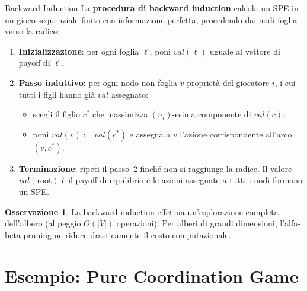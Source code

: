 \documentclass[12pt,a4paper,twoside]{book}
\theoremstyle{plain}
\theoremstyle{definition}
\newtheorem{remark}[theorem]{Osservazione}
\begin{document}
\begin{defbox}{Backward Induction}
La \textbf{procedura di backward induction} calcola un SPE in un gioco sequenziale finito con informazione perfetta, procedendo dai nodi foglia verso la radice:
\begin{enumerate}
  \item \textbf{Inizializzazione}: per ogni foglia $\ell$, poni $\mathit{val}(\ell)$ uguale al vettore di payoff di $\ell$.
  \item \textbf{Passo induttivo}: per ogni nodo non-foglia $v$ proprietà del giocatore $i$, i cui tutti i figli hanno già $\mathit{val}$ assegnato:
    \begin{itemize}
      \item scegli il figlio $c^*$ che massimizza $(u_i)$-esima componente di $\mathit{val}(c)$;
      \item poni $\mathit{val}(v) := \mathit{val}(c^*)$ e assegna a $v$ l'azione corrispondente all'arco $(v,c^*)$.
    \end{itemize}
  \item \textbf{Terminazione}: ripeti il passo~2 finché non si raggiunge la radice. Il valore $\mathit{val}(\text{root})$ è il payoff di equilibrio e le azioni assegnate a tutti i nodi formano un SPE.
\end{enumerate}
\end{defbox}

\begin{remark}
La backward induction effettua un'esplorazione completa dell'albero (al peggio $O(|V|)$ operazioni). Per alberi di grandi dimensioni, l'alfa-beta pruning ne riduce drasticamente il costo computazionale.
\end{remark}

\section{Esempio: Pure Coordination Game}
\end{document}
